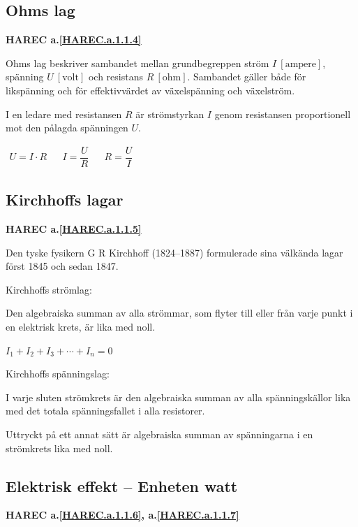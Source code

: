 \subsection{Ohms lag}
\textbf{HAREC a.\ref{HAREC.a.1.1.4}\label{myHAREC.a.1.1.4}}

Ohms lag beskriver sambandet mellan grundbegreppen ström
\(I\ \mathrm{[ampere]}\), spänning \(U\ \mathrm{[volt]}\) och resistans
\(R\ \mathrm{[ohm]}\).
Sambandet gäller både för likspänning och för effektivvärdet av växelspänning och
växelström.

I en ledare med resistansen \(R\) är strömstyrkan \(I\) genom resistansen
proportionell mot den pålagda spänningen \(U\).

\(
\begin{array}{lllll}U=I \cdot R & & I=\dfrac{U}{R} & & R=\dfrac{U}{I}\end{array}
\)

\subsection{Kirchhoffs lagar}
\textbf{HAREC a.\ref{HAREC.a.1.1.5}\label{myHAREC.a.1.1.5}}

Den tyske fysikern G R Kirchhoff (1824--1887) formulerade sina välkända lagar
först 1845 och sedan 1847.

Kirchhoffs strömlag:

Den algebraiska summan av alla strömmar, som flyter till eller från varje punkt
i en elektrisk krets, är lika med noll.

\(I_1 + I_2 + I_3 + \cdots + I_n = 0\)

Kirchhoffs spänningslag:

I varje sluten strömkrets är den algebraiska summan av alla spänningskällor lika
med det totala spänningsfallet i alla resistorer.

Uttryckt på ett annat sätt är algebraiska summan av spänningarna i en
strömkrets lika med noll.

\subsection{Elektrisk effekt -- Enheten watt}
\textbf{HAREC a.\ref{HAREC.a.1.1.6}\label{myHAREC.a.1.1.6}, a.\ref{HAREC.a.1.1.7}\label{myHAREC.a.1.1.7}}

